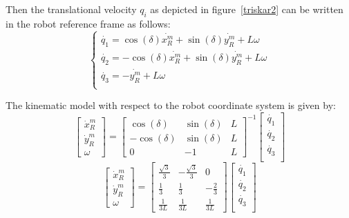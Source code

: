 Then the translational velocity $q_i$ as depicted in figure~\ref{triskar2} can be written in the robot reference frame as follows:
\begin{equation}
\begin{cases}
\dot{q_1} =\cos(\delta)\dot{x^m _R}+\sin(\delta)\dot{y^m _R}+L{\omega}\\
\dot{q_2} =-\cos(\delta)\dot{x^m _R}+\sin(\delta)\dot{y^m _R}+L{\omega}\\
\dot{q_3} =-\dot{y^m _R}+L{\omega}\\
\end{cases}
\end{equation}

The kinematic model with respect to the robot coordinate system is given by:
\begin{equation}
\begin{bmatrix}
\dot{x}^m _R\\
\dot{y}^m _R\\
{\omega}
\end{bmatrix} =
\begin{bmatrix}
\cos(\delta) & \sin(\delta) & L\\
-\cos(\delta) & \sin(\delta) & L\\
0 & -1 & L
\end{bmatrix}^{-1}
\begin{bmatrix}
\dot{q_1}\\
\dot{q_2}\\
\dot{q_3}\\
\end{bmatrix}	
\label{model1}
\end{equation}
\begin{equation*}
	\begin{bmatrix}
		\dot{x}^m _R\\
		\dot{y}^m _R\\
		{\omega}
	\end{bmatrix} =
	\begin{bmatrix}
		\frac{\sqrt{3}}{3} & -\frac{\sqrt{3}}{3} & 0\\
		\frac{1}{3} & \frac{1}{3} & -\frac{2}{3}\\
		\frac{1}{3L} & \frac{1}{3L} & \frac{1}{3L}
	\end{bmatrix}
	\begin{bmatrix}
		\dot{q_1}\\
		\dot{q_2}\\
		\dot{q_3}\\
	\end{bmatrix}	
\end{equation*}

